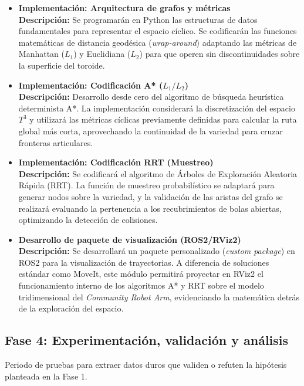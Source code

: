\begin{itemize}
    \item \textbf{Implementación: Arquitectura de grafos y métricas} \\
    \textbf{Descripción:} Se programarán en Python las estructuras de datos fundamentales para representar el espacio cíclico. Se codificarán las funciones matemáticas de distancia geodésica (\textit{wrap-around}) adaptando las métricas de Manhattan ($L_1$) y Euclidiana ($L_2$) para que operen sin discontinuidades sobre la superficie del toroide.

    \item \textbf{Implementación: Codificación A* ($L_1/L_2$)} \\
    \textbf{Descripción:} Desarrollo desde cero del algoritmo de búsqueda heurística determinista A*. La implementación considerará la discretización del espacio $T^3$ y utilizará las métricas cíclicas previamente definidas para calcular la ruta global más corta, aprovechando la continuidad de la variedad para cruzar fronteras articulares.

    \item \textbf{Implementación: Codificación RRT (Muestreo)} \\
    \textbf{Descripción:} Se codificará el algoritmo de Árboles de Exploración Aleatoria Rápida (RRT). La función de muestreo probabilístico se adaptará para generar nodos sobre la variedad, y la validación de las aristas del grafo se realizará evaluando la pertenencia a los recubrimientos de bolas abiertas, optimizando la detección de colisiones.

    \item \textbf{Desarrollo de paquete de visualización (ROS2/RViz2)} \\
    \textbf{Descripción:} Se desarrollará un paquete personalizado (\textit{custom package}) en ROS2 para la visualización de trayectorias. A diferencia de soluciones estándar como MoveIt, este módulo permitirá proyectar en RViz2 el funcionamiento interno de los algoritmos A* y RRT sobre el modelo tridimensional del \textit{Community Robot Arm}, evidenciando la matemática detrás de la exploración del espacio.
\end{itemize}

\subsection*{Fase 4: Experimentación, validación y análisis}
Periodo de pruebas para extraer datos duros que validen o refuten la hipótesis planteada en la Fase 1.

